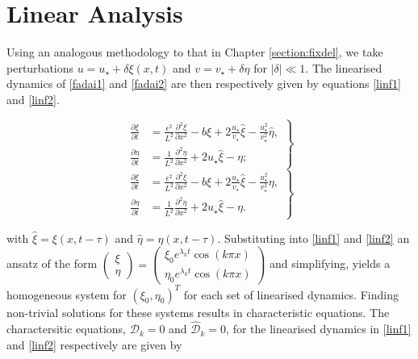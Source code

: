 \section{Linear Analysis}

Using an analogous methodology to that in Chapter \ref{section:fixdel}, we take perturbations $u=u_\star+\delta\xi(x,t)$ and $v=v_\star+\delta\eta$ for $|\delta|\ll1$. The linearised dynamics of \eqref{fadai1} and \eqref{fadai2} are then respectively given by equations \eqref{linf1} and \eqref{linf2}.

\begin{multicols}{2}
\begin{equation}\label{linf1}
    \left.\begin{split}
\frac{\partial \xi}{\partial t}&=\frac{\epsilon^2}{L^2}\frac{\partial^2 \xi}{\partial x^2}-b\xi+2\frac{u_\star}{v_\star}\hat{\xi}-\frac{u_\star^2}{v_\star^2}\hat{\eta},\\
\frac{\partial \eta}{\partial t}&=\frac{1}{L^2}\frac{\partial^2 \eta}{\partial x^2}+2u_\star\hat{\xi}-\eta;
\end{split}\right\}
\end{equation}\break
\begin{equation}
    \left.\begin{split}
\frac{\partial \xi}{\partial t}&=\frac{\epsilon^2}{L^2}\frac{\partial^2 \xi}{\partial x^2}-b\xi+2\frac{u_\star}{v_\star}\hat{\xi}-\frac{u_\star^2}{v_\star^2}\eta,\\
\frac{\partial \eta}{\partial t}&=\frac{1}{L^2}\frac{\partial^2 \eta}{\partial x^2}+2u_\star\hat{\xi}-\eta.\label{linf2}
\end{split}\right\}
\end{equation}
\end{multicols}
with $\hat{\xi}=\xi(x,t-\tau)$ and $\hat{\eta}=\eta(x,t-\tau)$. Substituting into \eqref{linf1} and \eqref{linf2} an ansatz of the form $\begin{pmatrix}\xi\\ \eta\end{pmatrix}=\begin{pmatrix}\xi_0e^{\lambda_kt}\cos(k\pi x)\\\eta_0e^{\lambda_kt}\cos(k\pi x)\end{pmatrix}$ and simplifying, yields a homogeneous system for $(\xi_0,\eta_0)^T$ for each set of linearised dynamics. Finding non-trivial solutions for these systems results in characteristic equations. The charactersitic equations, $\mathcal{D}_k=0$ and $\hat{\mathcal{D}}_k=0$, for the linearised dynamics in \eqref{linf1} and \eqref{linf2} respectively are given by

